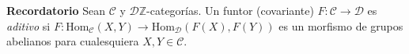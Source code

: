 \documentclass[preview]{standalone}
\begin{document}
\begin{center}
\flushleft \textbf{Recordatorio} Sean $\mathscr{C}$ y $\mathscr{D} \mathbb{Z}$-categorías. Un funtor (covariante) $F:\mathscr{C}\to\mathscr{D}$ es \emph{aditivo} si $F:\text{Hom}_\mathscr{C}(X,Y)\to \text{Hom}_\mathscr{D}(F(X), F(Y))$ es un morfismo de grupos abelianos para cualesquiera $X,Y\in\mathscr{C}$.
\end{center}
\end{document}
